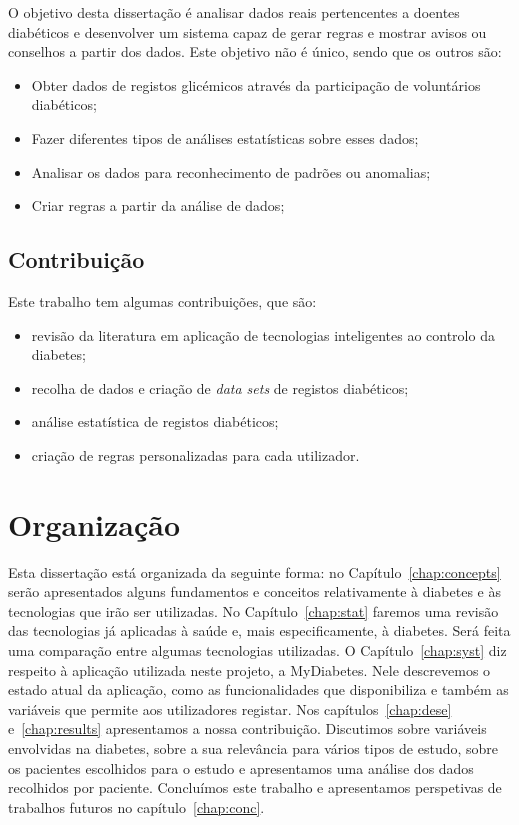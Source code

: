 O objetivo desta dissertação é analisar dados reais pertencentes a doentes diabéticos e desenvolver um sistema capaz de gerar regras e mostrar avisos ou conselhos a partir dos dados. Este objetivo não é único, sendo que os outros são:

\begin{itemize}
	\item Obter dados de registos glicémicos através da participação de voluntários diabéticos;
	\item Fazer diferentes tipos de análises estatísticas sobre esses dados;
	\item Analisar os dados para reconhecimento de padrões ou anomalias;
	\item Criar regras a partir da análise de dados;

\end{itemize}


\subsection{Contribuição}

Este trabalho tem algumas contribuições, que são:

\begin{itemize}
	\item revisão da literatura em aplicação de tecnologias inteligentes ao controlo da diabetes;
	\item recolha de dados e criação de \textit{data sets} de registos diabéticos;
	\item análise estatística de registos diabéticos;
	\item criação de regras personalizadas para cada utilizador.
	
\end{itemize}


\section{Organização}

Esta dissertação está organizada da seguinte forma: no Capítulo~\ref{chap:concepts} serão apresentados alguns fundamentos e conceitos relativamente à diabetes e às tecnologias que irão ser utilizadas.
No Capítulo~\ref{chap:stat} faremos uma revisão das tecnologias já aplicadas à saúde e, mais especificamente, à diabetes. Será feita uma comparação entre algumas tecnologias utilizadas.
O Capítulo~\ref{chap:syst} diz respeito à aplicação utilizada neste projeto, a MyDiabetes. Nele descrevemos o estado atual da aplicação, como as funcionalidades que disponibiliza e também as variáveis que permite aos utilizadores registar.
Nos capítulos~\ref{chap:dese} e~\ref{chap:results} apresentamos a nossa contribuição. Discutimos sobre variáveis envolvidas na diabetes, sobre a sua relevância para vários tipos de estudo, sobre os pacientes escolhidos para o estudo e apresentamos uma análise dos dados recolhidos por paciente. Concluímos este trabalho e apresentamos perspetivas de trabalhos futuros no capítulo~\ref{chap:conc}.





